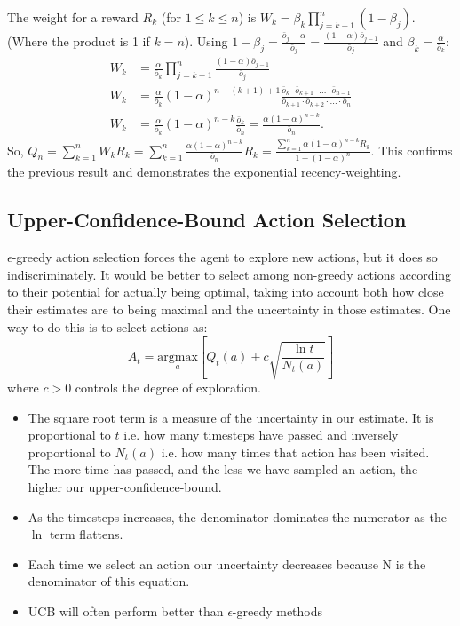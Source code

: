 {The weight for a reward $R_k$ (for $1 \le k \le n$) is $W_k = \beta_k \prod_{j=k+1}^{n} (1-\beta_j)$. (Where the product is 1 if $k=n$).
Using $1-\beta_j = \frac{\bar{o}_j - \alpha}{\bar{o}_j} = \frac{(1-\alpha)\bar{o}_{j-1}}{\bar{o}_j}$ and $\beta_k = \frac{\alpha}{\bar{o}_k}$:
\begin{align*}
W_k &= \frac{\alpha}{\bar{o}_k} \prod_{j=k+1}^{n} \frac{(1-\alpha)\bar{o}_{j-1}}{\bar{o}_j} \\
W_k &= \frac{\alpha}{\bar{o}_k} (1-\alpha)^{n-(k+1)+1} \frac{\bar{o}_k \cdot \bar{o}_{k+1} \cdot \ldots \cdot \bar{o}_{n-1}}{\bar{o}_{k+1} \cdot \bar{o}_{k+2} \cdot \ldots \cdot \bar{o}_n} \\
W_k &= \frac{\alpha}{\bar{o}_k} (1-\alpha)^{n-k} \frac{\bar{o}_k}{\bar{o}_n} = \frac{\alpha(1-\alpha)^{n-k}}{\bar{o}_n}.
\end{align*}
So, $Q_n = \sum_{k=1}^n W_k R_k = \sum_{k=1}^n \frac{\alpha(1-\alpha)^{n-k}}{\bar{o}_n} R_k = \frac{\sum_{k=1}^n \alpha(1-\alpha)^{n-k} R_k}{1-(1-\alpha)^n}$.
This confirms the previous result and demonstrates the exponential recency-weighting.

}



\subsection{Upper-Confidence-Bound Action Selection}
$\epsilon$-greedy action selection forces the agent to explore new actions, but it does so indiscriminately. It would be better to select among non-greedy actions according to their potential for actually being optimal, taking into account both how close their estimates are to being maximal and the uncertainty in those estimates. One way to do this is to select actions as:
\begin{equation}
A_t = \underset{a}{\text{argmax}} \left[ Q_t(a) + c \sqrt{\frac{\ln t}{N_t(a)}} \right] \tag{10}
\end{equation}
where $c > 0$ controls the degree of exploration.

\begin{itemize}
    \item The square root term is a measure of the uncertainty in our estimate. It is proportional to $t$ i.e. how many timesteps have passed and inversely proportional to $N_t(a)$ i.e. how many times that action has been visited. The more time has passed, and the less we have sampled an action, the higher our upper-confidence-bound.
    \item As the timesteps increases, the denominator dominates the numerator as the $\ln$ term flattens.
    \item Each time we select an action our uncertainty decreases because N is the denominator of this equation.
    \item UCB will often perform better than $\epsilon$-greedy methods
\end{itemize}

